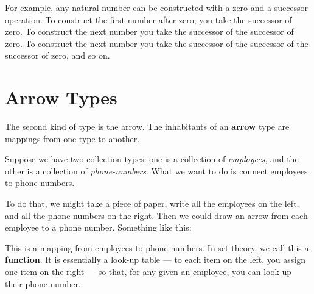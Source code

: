 \documentclass{book}
\numberwithin{equation}{chapter}
\newcommand{\vocab}{\textbf}
\begin{document}
For example, any natural number can be constructed with a zero and a successor operation. To construct the first number after zero, you take the successor of zero. To construct the next number you take the successor of the successor of zero. To construct the next number you take the successor of the successor of the successor of zero, and so on.


\section{Arrow Types}

The second kind of type is the arrow. The inhabitants of an \vocab{arrow} type are mappings from one type to another.

Suppose we have two collection types: one is a collection of \textit{employees}, and the other is a collection of \textit{phone-numbers}. What we want to do is connect employees to phone numbers.

To do that, we might take a piece of paper, write all the employees on the left, and all the phone numbers on the right. Then we could draw an arrow from each employee to a phone number. Something like this:

\begin{center}
\end{center}

\noindent
This is a mapping from employees to phone numbers. In set theory, we call this a \vocab{function}. It is essentially a look-up table --- to each item on the left, you assign one item on the right --- so that, for any given an employee, you can look up their phone number.
\end{document}
